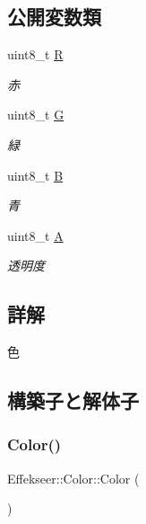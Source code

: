 \subsection*{公開変数類}
\begin{DoxyCompactItemize}
\item 
uint8\+\_\+t \mbox{\hyperlink{struct_effekseer_1_1_color_aae98e2323761b1b2b2d9d182e3af3b40}{R}}
\begin{DoxyCompactList}\small\item\em 赤 \end{DoxyCompactList}\item 
uint8\+\_\+t \mbox{\hyperlink{struct_effekseer_1_1_color_a6d82d496ac86f8ac07ec0e8710126ef9}{G}}
\begin{DoxyCompactList}\small\item\em 緑 \end{DoxyCompactList}\item 
uint8\+\_\+t \mbox{\hyperlink{struct_effekseer_1_1_color_a0313689224c549471daa2bfe58839d84}{B}}
\begin{DoxyCompactList}\small\item\em 青 \end{DoxyCompactList}\item 
uint8\+\_\+t \mbox{\hyperlink{struct_effekseer_1_1_color_a9ced071dfdca28d4da9490d24a958351}{A}}
\begin{DoxyCompactList}\small\item\em 透明度 \end{DoxyCompactList}\end{DoxyCompactItemize}


\subsection{詳解}
色 

\subsection{構築子と解体子}
\mbox{\label{struct_effekseer_1_1_color_a4d4083a195447aba952703b663e7619a}} 
\subsubsection{\texorpdfstring{Color()}{Color()}\hspace{0.1cm}{\footnotesize\ttfamily [1/2]}}
{\footnotesize\ttfamily Effekseer\+::\+Color\+::\+Color (\begin{DoxyParamCaption}{ }\end{DoxyParamCaption})}



